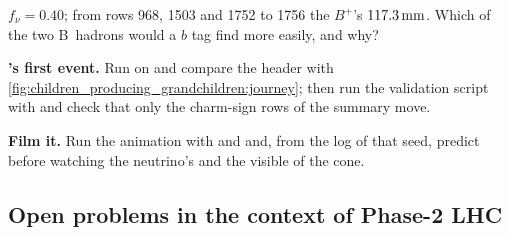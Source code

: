\begin{exercises}
  $f_\nu=0.40$; from rows 968, 1503 and 1752 to 1756 the $B^+$'s
  $117.3\,\mathrm{mm}$. Which of the two B~hadrons would a $b$ tag find more easily,
  and why?
\item \textbf{\PYTHIA's first event.} Run  on
   and compare the
  header with \cref{fig:children_producing_grandchildren:journey}; then
  run the validation script with 
  and check that only the charm-sign rows of the summary move.
\item \textbf{Film it.} Run the animation with 
  and  and, from the  log of that seed, predict
  before watching the neutrino's \pt and the visible \pt of the cone.
\end{exercises}

\subsection*{Open problems in the context of Phase-2 LHC}
\label{sec:children_producing_grandchildren:open_problems}

